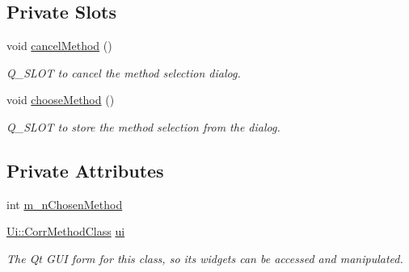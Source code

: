 \subsection*{Private Slots}
\begin{DoxyCompactItemize}
\item 
\hypertarget{classCorrMethod_a87e628d7ef6facc9a402880d7e01ea36}{
void \hyperlink{classCorrMethod_a87e628d7ef6facc9a402880d7e01ea36}{cancelMethod} ()}
\label{classCorrMethod_a87e628d7ef6facc9a402880d7e01ea36}

\begin{DoxyCompactList}\small\item\em Q\_\-SLOT to cancel the method selection dialog. \item\end{DoxyCompactList}\item 
\hypertarget{classCorrMethod_a7522197ac15c7563aee8d15d0cff3d95}{
void \hyperlink{classCorrMethod_a7522197ac15c7563aee8d15d0cff3d95}{chooseMethod} ()}
\label{classCorrMethod_a7522197ac15c7563aee8d15d0cff3d95}

\begin{DoxyCompactList}\small\item\em Q\_\-SLOT to store the method selection from the dialog. \item\end{DoxyCompactList}\end{DoxyCompactItemize}
\subsection*{Private Attributes}
\begin{DoxyCompactItemize}
\item 
int \hyperlink{classCorrMethod_a3e64e1a2c9eabff57b7e58eaff13f45f}{m\_\-nChosenMethod}
\item 
\hypertarget{classCorrMethod_a866bb1b72235d777ca96a6ce9701f9f6}{
\hyperlink{classUi_1_1CorrMethodClass}{Ui::CorrMethodClass} \hyperlink{classCorrMethod_a866bb1b72235d777ca96a6ce9701f9f6}{ui}}
\label{classCorrMethod_a866bb1b72235d777ca96a6ce9701f9f6}

\begin{DoxyCompactList}\small\item\em The Qt GUI form for this class, so its widgets can be accessed and manipulated. \item\end{DoxyCompactList}\end{DoxyCompactItemize}


